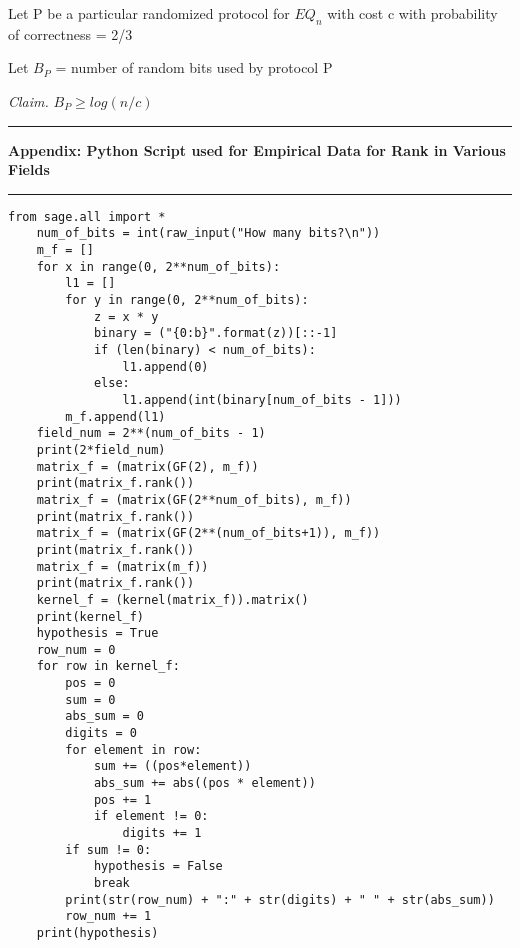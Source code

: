 \documentclass[11pt]{article}
\newcommand\newAppendix[2]{\vspace{.25in}\hrule\textbf{#1 #2}\vspace{.5em}\hrule\vspace{.10in}}
\newcommand\claim{\emph{Claim.}\newline}
\begin{document}
Let P be a particular randomized protocol for $EQ_n$ with cost c with probability of correctness = 2/3

Let $B_P$ = number of random bits used by protocol P 

\claim
$B_{P} \geq log(n/c)$

\proof 
\newpage
\newAppendix{Appendix:}{Python Script used for Empirical Data for Rank in Various Fields}
\begin{lstlisting}
from sage.all import *
    num_of_bits = int(raw_input("How many bits?\n"))
    m_f = []
    for x in range(0, 2**num_of_bits):
        l1 = []
        for y in range(0, 2**num_of_bits):
            z = x * y
            binary = ("{0:b}".format(z))[::-1]
            if (len(binary) < num_of_bits):
                l1.append(0)
            else:
                l1.append(int(binary[num_of_bits - 1]))
        m_f.append(l1)
    field_num = 2**(num_of_bits - 1)
    print(2*field_num)
    matrix_f = (matrix(GF(2), m_f))
    print(matrix_f.rank())
    matrix_f = (matrix(GF(2**num_of_bits), m_f))
    print(matrix_f.rank()) 
    matrix_f = (matrix(GF(2**(num_of_bits+1)), m_f))
    print(matrix_f.rank())
    matrix_f = (matrix(m_f))
    print(matrix_f.rank())
    kernel_f = (kernel(matrix_f)).matrix()
    print(kernel_f)
    hypothesis = True
    row_num = 0
    for row in kernel_f:
        pos = 0
        sum = 0
        abs_sum = 0
        digits = 0
        for element in row:
            sum += ((pos*element))
            abs_sum += abs((pos * element))
            pos += 1
            if element != 0:
                digits += 1
        if sum != 0:
            hypothesis = False
            break
        print(str(row_num) + ":" + str(digits) + " " + str(abs_sum))
        row_num += 1
    print(hypothesis) 
       
\end{lstlisting}
\end{document}
